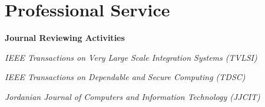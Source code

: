\section*{Professional Service}
\begin{description}
\item \textbf{Journal Reviewing Activities}
\item \emph{IEEE Transactions on Very Large Scale Integration Systems (TVLSI)} 
\item \emph{IEEE Transactions on Dependable and Secure Computing (TDSC)} 
\item \emph{Jordanian Journal of Computers and Information Technology (JJCIT)} 
\end{description}
